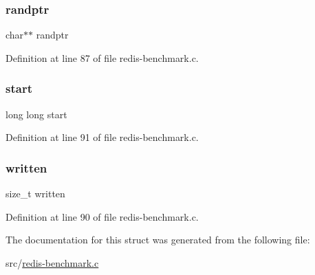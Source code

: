 \subsubsection{\texorpdfstring{randptr}{randptr}}
{\footnotesize\ttfamily char$\ast$$\ast$ randptr}



Definition at line 87 of file redis-\/benchmark.\+c.

\mbox{\label{struct__client_a9ce58dcdf0248f7daa63c5827931c2bf}} 
\subsubsection{\texorpdfstring{start}{start}}
{\footnotesize\ttfamily long long start}



Definition at line 91 of file redis-\/benchmark.\+c.

\mbox{\label{struct__client_ac7ab1030344ab638a27ba415c914288a}} 
\subsubsection{\texorpdfstring{written}{written}}
{\footnotesize\ttfamily size\+\_\+t written}



Definition at line 90 of file redis-\/benchmark.\+c.



The documentation for this struct was generated from the following file\+:\begin{DoxyCompactItemize}
\item 
src/\hyperlink{redis-benchmark_8c}{redis-\/benchmark.\+c}\end{DoxyCompactItemize}
